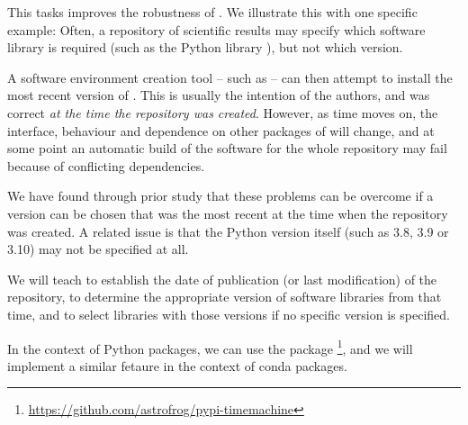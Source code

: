\begin{task}[
  title=repo2docker development,
  id=repo2docker-timemachine,
  lead=SRL,
  PM=12,
  partners={QS}
]

This tasks improves the robustness of \repotodocker{}. We illustrate this with one specific example:
Often, a repository of scientific results may
specify which software library is required (such as the Python library
), but not which version.

A software environment creation tool -- such as \repotodocker{} -- can then
attempt to install the most recent version of . This is
usually the intention of the authors, and was correct \emph{at the time the repository
was created}. However, as time moves on, the interface, behaviour and dependence
on other packages of  will change, and at some point an
automatic build of the software for the whole repository may fail because of
conflicting dependencies.

We have found through prior study\cite{repo2docker-checker2020} that these problems can be
overcome if a  version can be chosen that was the
most recent at the time when the repository was created. A related
issue is that the Python version itself (such as 3.8, 3.9 or 3.10) may
not be specified at all.

We will teach \repotodocker{} to establish the date of publication
(or last modification) of the repository, to determine the appropriate version
of software libraries from that time, and to select libraries with those
versions if no specific version is specified.

In the context of Python packages, we can use the
package \footnote{\url{https://github.com/astrofrog/pypi-timemachine}},
and we will implement a similar fetaure in the context of conda packages.
\end{task}
